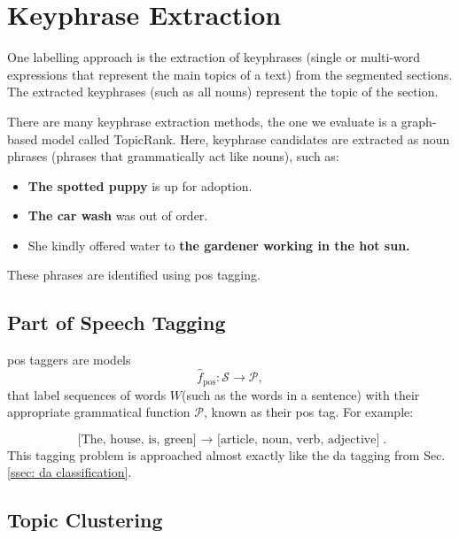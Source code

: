     \section{Keyphrase Extraction \label{ssec: keyphrase extraction}}
    One labelling approach is the extraction of \glspl{keyphrase} (single or multi-word expressions that represent the main topics of a text) from the segmented sections\cite{hasan2014automatic}. The extracted \glspl{keyphrase} (such as all nouns) represent the topic of the section.

    There are many \gls{keyphrase} extraction methods, the one we evaluate is a graph-based \gls{model} called TopicRank\cite{bougouin-etal-2013-topicrank}. Here, \gls{keyphrase} candidates are extracted as noun phrases (phrases that grammatically act like nouns), such as:

    \begin{itemize}
        \item \textbf{The spotted puppy} is up for adoption.
        \item \textbf{The car wash} was out of order.
        \item She kindly offered water to \textbf{the gardener working in the hot sun.}
    \end{itemize}
    These phrases are identified using \gls{pos} tagging.
        \subsection{Part of Speech Tagging \label{sssec: POS tagging}}

        \Gls{pos} taggers are \glspl{model}
        \begin{equation}
          \hat{f}_{\text{pos}}: \mathcal{S} \rightarrow \mathcal{P},
        \end{equation}
        that label sequences of words $W$(such as the words in a sentence) with their appropriate grammatical function $\mathcal{P}$, known as their \gls{pos} tag. For example:

        \begin{equation*}
        \text{[The, house, is, green] $\rightarrow$ [article, noun, verb, adjective]}.
        \end{equation*}
        This tagging problem is approached almost exactly like the \gls{da} tagging from Sec. \ref{ssec: da classification}\cite{flairNLP}.


        \subsection{Topic Clustering}

